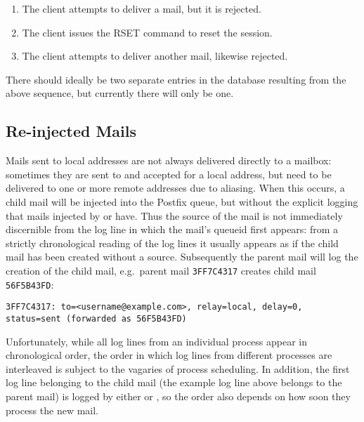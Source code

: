 \begin{enumerate}

    \item The client attempts to deliver a mail, but it is rejected.

    \item The client issues the RSET command to reset the 
        session.

    \item The client attempts to deliver another mail, likewise rejected.

\end{enumerate}

There should ideally be two separate entries in the database resulting from
the above sequence, but currently there will only be one.



\subsection{Re-injected Mails}

\label{Re-injected mails}

\label{tracking re-injected mail}

Mails sent to local addresses are not always delivered directly to a
mailbox: sometimes they are sent to and accepted for a local address, but
need to be delivered to one or more remote addresses due to aliasing.  When
this occurs, a child mail will be injected into the Postfix queue, but
without the explicit logging that mails injected by  or
 have.  Thus the source of the mail is not immediately
discernible from the log line in which the mail's queueid first appears:
from a strictly chronological reading of the log lines it usually appears
as if the child mail has been created without a source.  Subsequently the
parent mail will log the creation of the child mail, e.g.\ parent mail
\texttt{3FF7C4317} creates child mail \texttt{56F5B43FD}\@:

\texttt{3FF7C4317: to=<username@example.com>, relay=local, \hfill{}
\newline{} \tab{} \tab{} delay=0, status=sent (forwarded as 56F5B43FD)}

Unfortunately, while all log lines from an individual process appear in
chronological order, the order in which log lines from different processes
are interleaved is subject to the vagaries of process scheduling.  In
addition, the first log line belonging to the child mail (the example log
line above belongs to the parent mail) is logged by either  or
, so the order also depends on how soon they process the
new mail.

